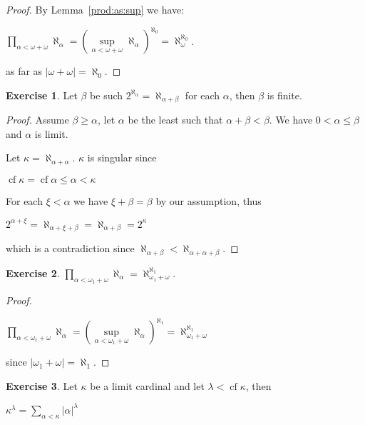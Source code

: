 \documentclass[8pt]{article}
\theoremstyle{definition}
\theoremstyle{definition}
\theoremstyle{definition}
\theoremstyle{definition}
\theoremstyle{definition}
\theoremstyle{definition}
\theoremstyle{definition}
\theoremstyle{definition}
\theoremstyle{definition}
\theoremstyle{definition}
\theoremstyle{definition}
\theoremstyle{definition}
\theoremstyle{definition}
\newtheorem{exercise}{Exercise}[section]
\theoremstyle{definition}
\theoremstyle{question}
\begin{document}
\begin{proof}
  By Lemma~\ref{prod:as:sup} we have:
  \begin{center}
    $\prod \limits_{\alpha < \omega + \omega} \aleph_{\alpha} = (\sup \limits_{\alpha < \omega + \omega} \aleph_{\alpha})^{\aleph_0} = \aleph_{\omega}^{\aleph_0}$.
  \end{center}
  as far as $|\omega + \omega| = \aleph_0$.
\end{proof}

\begin{exercise}
  Let $\beta$ be such $2^{\aleph_{\alpha}} = \aleph_{\alpha + \beta}$ for each $\alpha$, then $\beta$ is finite.
\end{exercise}

\begin{proof}
  Assume $\beta \geq \alpha$, let $\alpha$ be the least such that $\alpha + \beta < \beta$.
  We have $0 < \alpha \leq \beta$ and $\alpha$ is limit. 
  
  Let $\kappa = \aleph_{\alpha + \alpha}$. $\kappa$ is singular since 
  \begin{center}
  $\operatorname{cf} \kappa = \operatorname{cf} \alpha \leq \alpha < \kappa$
  \end{center}

  For each $\xi < \alpha$ we have $\xi + \beta = \beta$ by our assumption, thus
  \begin{center}
    $2^{\alpha + \xi} = \aleph_{\alpha + \xi + \beta} = \aleph_{\alpha + \beta} = 2^{\kappa}$
  \end{center}
  which is a contradiction since $\aleph_{\alpha + \beta} < \aleph_{\alpha + \alpha+ \beta}$.
\end{proof}

\begin{exercise}
  $\prod \limits_{\alpha < \omega_1 + \omega} \aleph_{\alpha} = \aleph^{\aleph_1}_{\omega_1 + \omega}$.
\end{exercise}

\begin{proof}
  \begin{center}
    $\prod \limits_{\alpha < \omega_1 + \omega} \aleph_{\alpha} = (\sup \limits_{\alpha < \omega_1 + \omega} \aleph_{\alpha})^{\aleph_1} = \aleph^{\aleph_1}_{\omega_1 + \omega}$
  \end{center}
  since $|\omega_1 + \omega| = \aleph_1$.
\end{proof}

\begin{exercise}
  Let $\kappa$ be a limit cardinal and let $\lambda < \operatorname{cf} \kappa$, then
  \begin{center}
    $\kappa^{\lambda} = \sum \limits_{\alpha < \kappa} |\alpha|^{\lambda}$
  \end{center}
\end{exercise}
\end{document}
